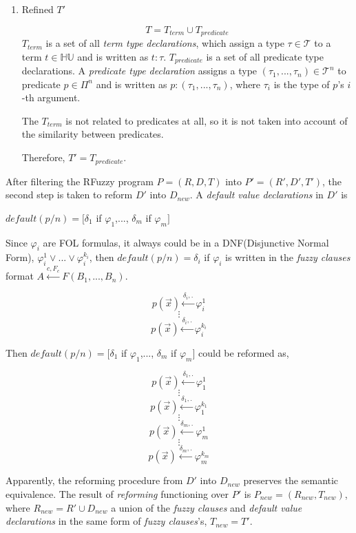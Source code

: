 \begin{enumerate}
 \item Refined $T'$
    
    \[T=T_{term} \cup T_{predicate}\]
    $T_{term}$ is a set of all \textit{term type declarations}, which assign a type $\tau \in \mathcal{T}$ to a term $t \in \mathbb{HU}$ and is written as $t : \tau$. $T_{predicate}$ is a set of all predicate type declarations. A \textit{predicate type declaration} assigns a type $(\tau_1,...,\tau_n) \in \mathcal{T}^n$ to predicate $p\in\Pi^n$ and is written as $p : (\tau_1,...,\tau_n)$, where $\tau_i$ is the type of $p$'s $i$-th argument.

    The $T_{term}$ is not related to predicates at all, so it is not taken into account of the similarity between predicates.

    Therefore, $T'=T_{predicate}$.
 \end{enumerate}

After filtering the RFuzzy program $P=(R,D,T)$ into $P'=(R',D',T')$, the second step is taken to reform $D'$ into $D_{new}$. A \textit{default value declarations} in $D'$ is
\begin{center}
 $default(p/n)=[\delta_1$ if $\varphi_1$,..., $\delta_m$ if $\varphi_m]$ 
\end{center}

Since $\varphi_i$ are FOL formulas, it always could be in a DNF(Disjunctive Normal Form), $\varphi_i^1 \vee ... \vee \varphi_i^{k_i}$, then $default(p/n) = \delta_i$ if $\varphi_i$ is written in the \textit{fuzzy clauses} format $A \stackrel{c,F_c}{\longleftarrow}F(B_1,...,B_n)$.

\[p(\vec{x}) \stackrel{\delta_i,.}{\longleftarrow} \varphi_i^1\]
\[\vdots\]
\[p(\vec{x}) \stackrel{\delta_i,.}{\longleftarrow} \varphi_i^{k_i}\]

Then $default(p/n)=[\delta_1$ if $\varphi_1$,..., $\delta_m$ if $\varphi_m]$ could be reformed as,

\[p(\vec{x}) \stackrel{\delta_1,.}{\longleftarrow} \varphi_1^1\]
\[\vdots\]
\[p(\vec{x}) \stackrel{\delta_1,.}{\longleftarrow} \varphi_1^{k_1}\]
\[\vdots\]
\[p(\vec{x}) \stackrel{\delta_m,.}{\longleftarrow} \varphi_m^1\]
\[\vdots\]
\[p(\vec{x}) \stackrel{\delta_m,.}{\longleftarrow} \varphi_m^{k_m}\]

Apparently, the reforming procedure from $D'$ into $D_{new}$ preserves the semantic equivalence. The result of \textit{reforming} functioning over $P'$ is $P_{new}=(R_{new},T_{new})$, where $R_{new} = R' \cup D_{new}$ a union of the \textit{fuzzy clauses} and \textit{default value declarations} in the same form of \textit{fuzzy clauses}'s, $T_{new}=T'$. 
